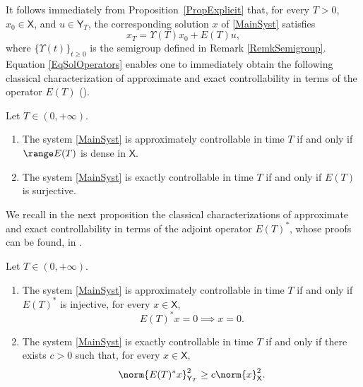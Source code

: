 It follows immediately from Proposition~\ref{PropExplicit} that, for every $T > 0$, $x_0 \in \mathsf X$, and $u \in \mathsf Y_T$, the corresponding solution $x$ of \eqref{MainSyst} satisfies\vspace*{-3pt}
\begin{equation}
\label{EqSolOperators}
x_T = \Upsilon(T) x_0 + E(T) u,
\end{equation}
where $\{\Upsilon(t)\}_{t \geq 0}$ is the semigroup defined in Remark \ref{RemkSemigroup}. Equation \eqref{EqSolOperators} enables one to immediately obtain the following classical characterization of approximate and exact controllability in terms of the operator $E(T)$ (\cf \cite[Lem.\,2.46]{Coron2007Control}).

\begin{prop}
\label{PropETControl}
Let $T \in (0, +\infty)$.
\begin{enumerate}
\item\label{PropETControlApprox} The system \eqref{MainSyst} is approximately controllable in time $T$ if and only if $\range E(T)$ is dense in $\mathsf X$.
\item\label{PropETControlExact} The system \eqref{MainSyst} is exactly controllable in time $T$ if and only if $E(T)$ is surjective.
\end{enumerate}
\end{prop}

We recall in the next proposition the classical characterizations of approximate and exact controllability in terms of the adjoint operator $E(T)^\ast$, whose proofs can be found, \eg in \cite[\S 2.3.2]{Coron2007Control}.

\begin{prop}
\label{PropControl}
Let $T \in (0, +\infty)$.
\begin{enumerate}
\item The system \eqref{MainSyst} is approximately controllable in time $T$ if and only if $E(T)^\ast$ is injective, \ie for every $x \in \mathsf X$,
\begin{equation}
\label{UniqueContinuation}
E(T)^\ast x = 0 \implies x = 0.
\end{equation}

\item\label{ControlExactETAst} The system \eqref{MainSyst} is exactly controllable in time $T$ if and only if there exists $c > 0$ such that, for every $x \in \mathsf X$,
\begin{equation}
\label{ObservabilityInequality}
\norm{E(T)^\ast x}_{\mathsf Y_T}^2 \geq c \norm{x}_{\mathsf X}^2.
\end{equation}
\end{enumerate}
\end{prop}

